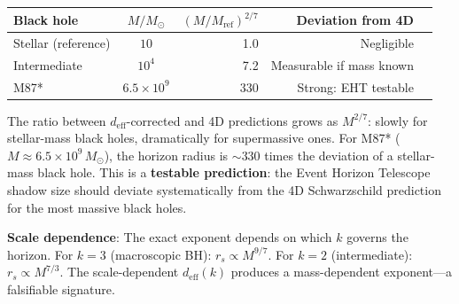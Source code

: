 \documentclass[12pt,a4paper]{article}
\begin{document}
\begin{center}\small
\begin{tabular}{lc rr l}
\toprule
Black hole & $M/M_\odot$ & $(M/M_{\mathrm{ref}})^{2/7}$ & Deviation from 4D \\
\midrule
Stellar (reference) & $10$ & 1.0 & Negligible \\
Intermediate & $10^4$ & 7.2 & Measurable if mass known \\
M87* & $6.5\times 10^9$ & 330 & Strong: EHT testable \\
\bottomrule
\end{tabular}
\end{center}

\noindent The ratio between $d_{\mathrm{eff}}$-corrected and 4D predictions grows as $M^{2/7}$: slowly for stellar-mass black holes, dramatically for supermassive ones. For M87* ($M \approx 6.5 \times 10^9\,M_\odot$), the horizon radius is $\sim 330$ times the deviation of a stellar-mass black hole. This is a \textbf{testable prediction}: the Event Horizon Telescope~\cite{EHT2019,EHT2022} shadow size should deviate systematically from the 4D Schwarzschild prediction for the most massive black holes.

\textbf{Scale dependence}: The exact exponent depends on which $k$ governs the horizon. For $k = 3$ (macroscopic BH): $r_s \propto M^{9/7}$. For $k = 2$ (intermediate): $r_s \propto M^{7/3}$. The scale-dependent $d_{\mathrm{eff}}(k)$ produces a mass-dependent exponent---a falsifiable signature.
\end{document}
